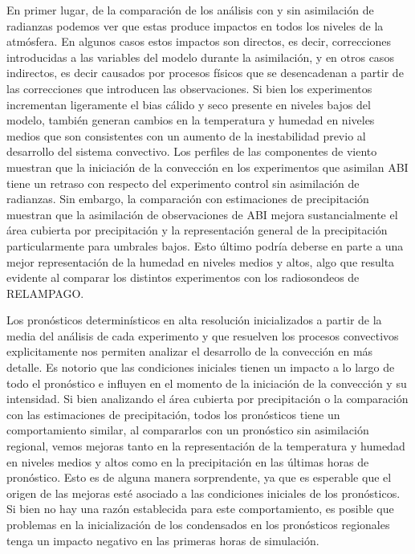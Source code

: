 \documentclass[12pt,oneside,a4paper]{reedthesis}
\begin{document}
En primer lugar, de la comparación de los análisis con y sin asimilación de radianzas podemos ver que estas produce impactos en todos los niveles de la atmósfera. En algunos casos estos impactos son directos, es decir, correcciones introducidas a las variables del modelo durante la asimilación, y en otros casos indirectos, es decir causados por procesos físicos que se desencadenan a partir de las correcciones que introducen las observaciones. Si bien los experimentos incrementan ligeramente el bias cálido y seco presente en niveles bajos del modelo, también generan cambios en la temperatura y humedad en niveles medios que son consistentes con un aumento de la inestabilidad previo al desarrollo del sistema convectivo. Los perfiles de las componentes de viento muestran que la iniciación de la convección en los experimentos que asimilan ABI tiene un retraso con respecto del experimento control sin asimilación de radianzas. Sin embargo, la comparación con estimaciones de precipitación muestran que la asimilación de observaciones de ABI mejora sustancialmente el área cubierta por precipitación y la representación general de la precipitación particularmente para umbrales bajos. Esto último podría deberse en parte a una mejor representación de la humedad en niveles medios y altos, algo que resulta evidente al comparar los distintos experimentos con los radiosondeos de RELAMPAGO.

Los pronósticos determinísticos en alta resolución inicializados a partir de la media del análisis de cada experimento y que resuelven los procesos convectivos explicitamente nos permiten analizar el desarrollo de la convección en más detalle. Es notorio que las condiciones iniciales tienen un impacto a lo largo de todo el pronóstico e influyen en el momento de la iniciación de la convección y su intensidad. Si bien analizando el área cubierta por precipitación o la comparación con las estimaciones de precipitación, todos los pronósticos tiene un comportamiento similar, al compararlos con un pronóstico sin asimilación regional, vemos mejoras tanto en la representación de la temperatura y humedad en niveles medios y altos como en la precipitación en las últimas horas de pronóstico. Esto es de alguna manera sorprendente, ya que es esperable que el origen de las mejoras esté asociado a las condiciones iniciales de los pronósticos. Si bien no hay una razón establecida para este comportamiento, es posible que problemas en la inicialización de los condensados en los pronósticos regionales tenga un impacto negativo en las primeras horas de simulación.
\end{document}
